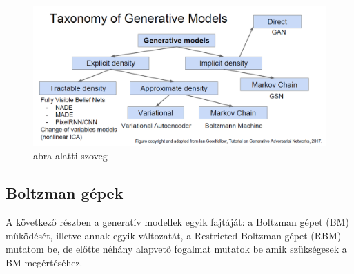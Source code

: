 
\begin{figure}[ht]
	\centering
	\includegraphics[width=0.8\columnwidth]{figures/generative_model_taxonomy.png}
	\caption{abra alatti szoveg}
	\label{fig:gen_models_tax}
\end{figure}


\subsection{Boltzman gépek}

A következő részben a generatív modellek egyik fajtáját: a Boltzman gépet (BM) működését, illetve annak egyik változatát, a Restricted Boltzman gépet (RBM) mutatom be, de előtte néhány alapvető fogalmat mutatok be amik szükségesek a BM megértéséhez.


